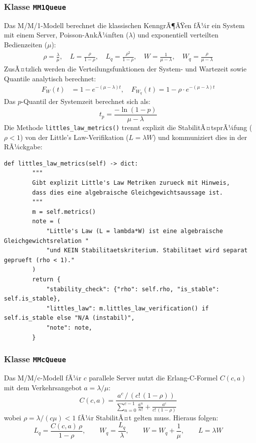 ﻿\documentclass[a4paper,12pt]{scrreprt}
\theoremstyle{definition}
\begin{document}
\subsubsection{Klasse \texttt{MM1Queue}}

Das M/M/1-Modell berechnet die klassischen KenngrÃ¶ÃŸen fÃ¼r ein System
mit einem Server, Poisson-AnkÃ¼nften ($\lambda$) und exponentiell
verteilten Bedienzeiten ($\mu$):
\begin{align}
	\rho = \frac{\lambda}{\mu}, \quad
	L = \frac{\rho}{1-\rho}, \quad
	L_q = \frac{\rho^2}{1-\rho}, \quad
	W = \frac{1}{\mu-\lambda}, \quad
	W_q = \frac{\rho}{\mu-\lambda}
\end{align}
ZusÃ¤tzlich werden die Verteilungsfunktionen der System- und Wartezeit
sowie Quantile analytisch berechnet:
\begin{align}
	F_W(t) &= 1 - e^{-(\mu-\lambda)t}, \quad
	F_{W_q}(t) = 1 - \rho \cdot e^{-(\mu-\lambda)t}
\end{align}
Das $p$-Quantil der Systemzeit berechnet sich als:
\begin{equation}
	t_p = \frac{-\ln(1-p)}{\mu - \lambda}
\end{equation}
Die Methode \texttt{littles\_law\_metrics()} trennt explizit die StabilitÃ¤tsprÃ¼fung
($\rho < 1$) von der Little's Law-Verifikation ($L = \lambda W$) und
kommuniziert dies in der RÃ¼ckgabe:

\begin{lstlisting}[style=python, caption={MM1Queue: Getrennte StabilitÃ¤ts- und Little's Law-Analyse}, label=lst:mm1-littles]
def littles_law_metrics(self) -> dict:
        """
        Gibt explizit Little's Law Metriken zurueck mit Hinweis,
        dass dies eine algebraische Gleichgewichtsaussage ist.
        """
        m = self.metrics()
        note = (
            "Little's Law (L = lambda*W) ist eine algebraische Gleichgewichtsrelation "
            "und KEIN Stabilitaetskriterium. Stabilitaet wird separat geprueft (rho < 1)."
        )
        return {
            "stability_check": {"rho": self.rho, "is_stable": self.is_stable},
            "littles_law": m.littles_law_verification() if self.is_stable else "N/A (instabil)",
            "note": note,
        }
\end{lstlisting}

\subsubsection{Klasse \texttt{MMcQueue}}

Das M/M/c-Modell fÃ¼r $c$ parallele Server nutzt die Erlang-C-Formel
$C(c, a)$ mit dem Verkehrsangebot $a = \lambda/\mu$:
\begin{equation}
	C(c, a) = \frac{a^c \,/\, (c!\,(1-\rho))}
	{\displaystyle\sum_{n=0}^{c-1} \frac{a^n}{n!} + \frac{a^c}{c!\,(1-\rho)}}
\end{equation}
wobei $\rho = \lambda/(c\mu) < 1$ fÃ¼r StabilitÃ¤t gelten muss.
Hieraus folgen:
\begin{equation}
	L_q = \frac{C(c,a)\,\rho}{1-\rho}, \qquad
	W_q = \frac{L_q}{\lambda}, \qquad
	W = W_q + \frac{1}{\mu}, \qquad
	L = \lambda W
\end{equation}
\end{document}
